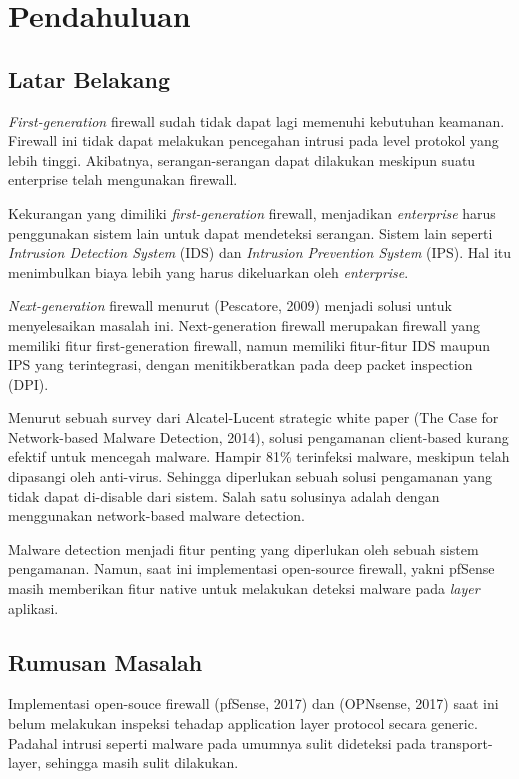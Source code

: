 \chapter{Pendahuluan}

\section{Latar Belakang}

\textit{First-generation} firewall sudah tidak dapat lagi memenuhi kebutuhan keamanan. Firewall ini tidak dapat melakukan pencegahan intrusi pada level protokol yang lebih tinggi. Akibatnya, serangan-serangan dapat dilakukan meskipun suatu enterprise telah mengunakan firewall.

Kekurangan yang dimiliki \textit{first-generation} firewall, menjadikan \textit{enterprise} harus penggunakan sistem lain untuk dapat mendeteksi serangan. Sistem lain seperti \textit{Intrusion Detection System} (IDS) dan \textit{Intrusion Prevention System} (IPS). Hal itu menimbulkan biaya lebih yang harus dikeluarkan oleh \textit{enterprise}.

\textit{Next-generation} firewall menurut (Pescatore, 2009) menjadi solusi untuk menyelesaikan masalah ini. Next-generation firewall merupakan firewall yang memiliki fitur first-generation firewall, namun memiliki fitur-fitur IDS maupun IPS yang terintegrasi, dengan menitikberatkan pada deep packet inspection (DPI).

Menurut sebuah survey dari Alcatel-Lucent strategic white paper (The Case for
Network-based Malware Detection, 2014), solusi pengamanan client-based kurang
efektif untuk mencegah malware. Hampir 81\% terinfeksi malware, meskipun telah
dipasangi oleh anti-virus. Sehingga diperlukan sebuah solusi pengamanan yang
tidak dapat di-disable dari sistem. Salah satu solusinya adalah dengan
menggunakan network-based malware detection.

Malware detection menjadi fitur penting yang diperlukan oleh sebuah sistem pengamanan. Namun, saat ini implementasi open-source firewall, yakni pfSense masih memberikan fitur native untuk melakukan deteksi malware pada \textit{layer} aplikasi.

\section{Rumusan Masalah}
Implementasi open-souce firewall (pfSense, 2017) dan (OPNsense, 2017) saat ini
belum melakukan inspeksi tehadap application layer protocol secara generic.
Padahal intrusi seperti malware pada umumnya sulit dideteksi pada transport-layer,
sehingga masih sulit dilakukan.

